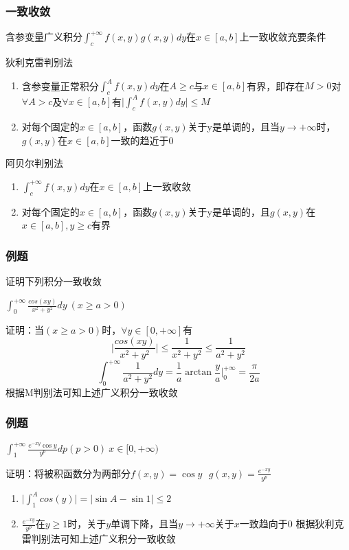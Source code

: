 \documentclass[xetex]{beamer}
\begin{document}
\begin{frame}
    \frametitle{一致收敛}
    含参变量广义积分$\int_c^{+\infty}{f(x,y)g(x,y)dy}$在$x\in[a,b]$上一致收敛充要条件
    \begin{block}{狄利克雷判别法}
        \begin{enumerate}
            \item 含参变量正常积分$\int_c^A{f(x,y)dy}$在$A\ge c$与$x\in [a,b]$有界，即存在$M>0$对$\forall A>c$及$\forall x\in [a,b]$有$\vert \int_c^A{f(x,y)dy}\vert \le M$
            \item 对每个固定的$x\in[a,b]$，函数$g(x,y)$关于y是单调的，且当$y \to +\infty$时，$g(x,y)$在$x\in[a,b]$一致的趋近于0
        \end{enumerate}
    \end{block}   
    \begin{block}{阿贝尔判别法}
        \begin{enumerate}
            \item $\int_c^{+\infty}{f(x,y)dy}$在$x\in[a,b]$上一致收敛
            \item 对每个固定的$x\in[a,b]$，函数$g(x,y)$关于y是单调的，且$g(x,y)$在$x\in[a,b],y\ge c$有界
        \end{enumerate}
    \end{block}   
\end{frame}

\begin{frame}
    \frametitle{例题}
    证明下列积分一致收敛
    \begin{block}{1}
        $\int_0^{+\infty}{\frac{cos(xy)}{x^2+y^2}dy}\ (x\ge a >0)$
        
        证明：当$(x\ge a >0)$时，$\forall y \in [0, +\infty]$有
        $$\vert \frac{cos(xy)}{x^2+y^2}\vert \le \frac{1}{x^2+y^2}\le \frac{1}{a^2+y^2}$$
        $$\int_0^{+\infty}{\frac{1}{a^2+y^2}dy}=\frac{1}{a}\arctan {\frac{y}{a}}|^{+\infty}_0=\frac{\pi}{2a}$$
        根据M判别法可知上述广义积分一致收敛
    \end{block}
    

\end{frame}


\begin{frame}
    \frametitle{例题}
    \begin{block}{2}
        $\int_{1}^{+\infty}{\frac{e^{-xy}\cos y}{y^p}dp}(p>0)\ x\in[0,+\infty)$
        
        证明：将被积函数分为两部分$f(x,y)=\cos y\ \ \ g(x,y)=\frac{e^{-xy}}{y^p}$
        \begin{enumerate}
            \item $\vert \int_1^A{cos(y)}\vert = \vert \sin A- \sin 1 \vert \le 2 $
            \item $\frac{e^{-xy}}{y^p}$在$y\ge 1$时，关于$y$单调下降，且当$y \to +\infty$关于$x$一致趋向于0
            根据狄利克雷判别法可知上述广义积分一致收敛
        \end{enumerate}
    \end{block}
\end{frame}
\end{document}
